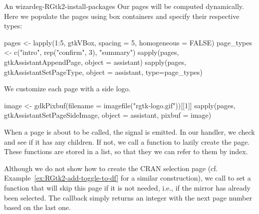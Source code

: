 \begin{example}{An  wizard}{eg-RGtk2-install-packages}
Our pages will be computed dynamically. Here we populate the pages
using box containers and specify their respective types:
\begin{Schunk}
\begin{Sinput}
 pages <- lapply(1:5, gtkVBox, spacing = 5, homogeneous = FALSE)
 page_types <- c("intro", rep("confirm", 3), "summary")
 sapply(pages, gtkAssistantAppendPage, object = assistant)
 sapply(pages, gtkAssistantSetPageType, object = assistant, 
        type=page_types)
\end{Sinput}
\end{Schunk}
%
We customize each page with a side logo.
\begin{Schunk}
\begin{Sinput}
 image <- gdkPixbuf(filename = imagefile("rgtk-logo.gif"))[[1]]
 sapply(pages, gtkAssistantSetPageSideImage, object = assistant, 
        pixbuf = image)
\end{Sinput}
\end{Schunk}

When a page is about to be called, the  signal is
emitted. In our handler, we check and see if it has any children. If
not, we call a function to lazily create the page. These functions are
stored in a list, so that they we can refer to them by index.
\begin{Schunk}
\end{Schunk}

Although we do not show how to create the CRAN selection page
(cf. Example~\ref{ex:RGtk2-add-toggle-to-df} for a similar
construction), we call  to
set a function that will skip this page if it is not needed, i.e., if
the mirror has already been selected. The callback simply returns an
integer with the next page number based on the last one.
\begin{Schunk}
\end{Schunk}


\end{example}
